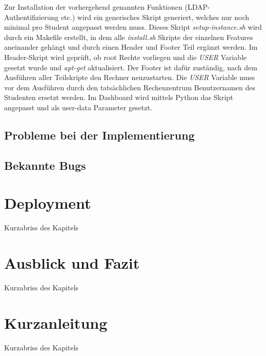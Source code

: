 Zur Installation der vorhergehend genannten Funktionen (LDAP-Authentifizierung etc.) wird ein generisches Skript generiert, welches nur noch minimal pro Student angepasst werden muss.
Dieses Skript \emph{setup-instance.sh} wird durch ein Makefile erstellt, in dem alle \emph{install.sh} Skripte der einzelnen Features aneinander gehängt und durch einen Header und Footer Teil ergänzt werden.
Im Header-Skript wird geprüft, ob root Rechte vorliegen und die \emph{USER} Variable gesetzt wurde und \emph{apt-get} aktualisiert. 
Der Footer ist dafür zuständig, nach dem Ausführen aller Teilskripte den Rechner neuzustarten.
Die \emph{USER} Variable muss vor dem Ausführen durch den tatsächlichen Rechenzentrum Benutzernamen des Studenten ersetzt werden.
Im Dashboard wird mittels Python das Skript angepasst und als user-data Parameter gesetzt.




\section{Probleme bei der Implementierung}

\section{Bekannte Bugs}


\chapter{Deployment}

Kurzabriss des Kapitels

\chapter{Ausblick und Fazit}

Kurzabriss des Kapitels

\chapter{Kurzanleitung}

Kurzabriss des Kapitels

		
   	\cleardoublepage
   	\setcounter{page}{12}
	 
	
\begin{appendix}   
\end{appendix}
\backmatter

